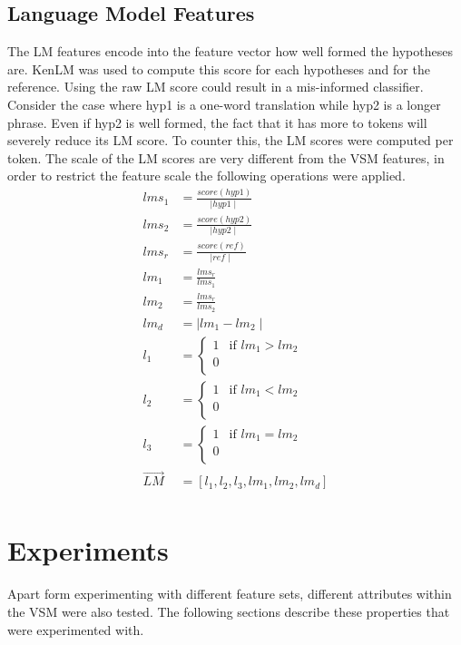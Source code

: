 \documentclass[11pt]{article}
\begin{document}
\subsection{Language Model Features}
The LM features encode into the feature vector how well formed the hypotheses
are. KenLM was used to compute this score for each hypotheses and for the
reference. Using the raw LM score could result in a mis-informed classifier.
Consider the case where hyp1 is a one-word translation while hyp2 is a longer
phrase. Even if hyp2 is well formed, the fact that it has more to tokens will
severely reduce its LM score. To counter this, the LM scores were computed per
token. The scale of the LM scores are very different from the VSM features, in
order to restrict the feature scale the following operations were applied.
\begin{align*}
lms_1 &= \frac{score(hyp1)} {\mid hyp1 \mid}\\
lms_2 &= \frac{score(hyp2)} {\mid hyp2 \mid}\\
lms_r &= \frac{score(ref)} {\mid ref \mid}\\
lm_1 &= \frac{lms_r}{lms_1}\\
lm_2 &= \frac{lms_r}{lms_2}\\
lm_d &= \mid lm_1 - lm_2 \mid\\
l_1 &= \begin{cases} 1 &\mbox{if } lm_1 > lm_2\\
0\\
\end{cases}\\
l_2 &= \begin{cases} 1 &\mbox{if } lm_1 < lm_2\\
0\\
\end{cases}\\
l_3 &= \begin{cases} 1 &\mbox{if } lm_1 = lm_2\\
0\\
\end{cases}\\
\vec{LM} &= [l_1, l_2, l_3, lm_1, lm_2, lm_d]\\
\end{align*}
\section{Experiments}
Apart form experimenting with different feature sets, different attributes
within the VSM were also tested. The following sections describe these
properties that were experimented with.
\end{document}
